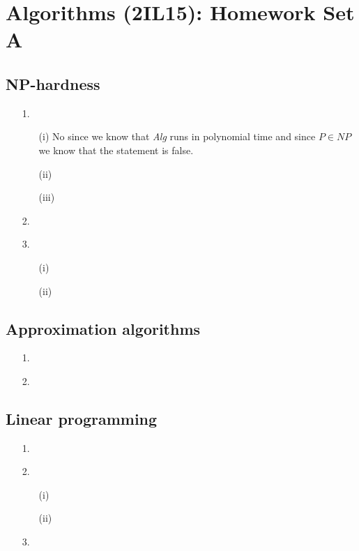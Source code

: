 \documentclass{article}
\title{}
\author{Mart Pluijmaekers}
\date{19-11-2012}
\begin{document}
\section*{Algorithms (2IL15): Homework Set A}

\subsection*{NP-hardness}
\begin{itemize}
\item[1.]
\begin{itemize}
\item[(i)] No since we know that \emph{Alg} runs in polynomial time and since $P\in NP$ we know that the statement is false.

\item[(ii)]

\item[(iii)]

\end{itemize}


\item[2.]

\item[3.]
\begin{itemize}
\item[(i)]

\item[(ii)]

\end{itemize}

\end{itemize}

\subsection*{Approximation algorithms}
\begin{itemize}
\item[1.]

\item[2.]

\end{itemize}

\subsection*{Linear programming}
\begin{itemize}
\item[1.]

\item[2.]
\begin{itemize}
\item[(i)]

\item[(ii)]

\end{itemize}

\item[3.]

\end{itemize}
\end{document}

